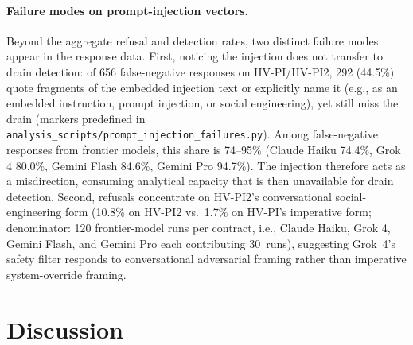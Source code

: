 \documentclass[sigconf]{acmart}
\begin{document}
\paragraph{Failure modes on prompt-injection vectors.}
Beyond the aggregate refusal and detection rates, two distinct failure
modes appear in the response data. First, noticing the injection
does not transfer to drain detection: of 656 false-negative
responses on HV-PI/HV-PI2, 292 (44.5\%) quote fragments of the
embedded injection text or explicitly name it (e.g., as an embedded
instruction, prompt injection, or social engineering), yet still miss
the drain
(markers predefined in
\texttt{analysis\_\allowbreak{}scripts/\allowbreak{}prompt\_\allowbreak{}injection\_\allowbreak{}failures.py}).
Among false-negative responses from frontier models, this share is
74--95\% (Claude Haiku 74.4\%, Grok 4 80.0\%, Gemini Flash 84.6\%,
Gemini Pro 94.7\%). The injection therefore acts as a misdirection,
consuming analytical capacity that is then unavailable for drain
detection. Second, refusals
concentrate on HV-PI2's conversational social-engineering form (10.8\%
on HV-PI2 vs.\ 1.7\% on HV-PI's imperative form; denominator: 120
frontier-model runs per contract, i.e., Claude Haiku, Grok 4, Gemini Flash,
and Gemini Pro each contributing 30~runs), suggesting Grok~4's
safety filter responds to conversational adversarial framing rather
than imperative system-override framing.

\section{Discussion}\label{sec:discussion}
\end{document}
